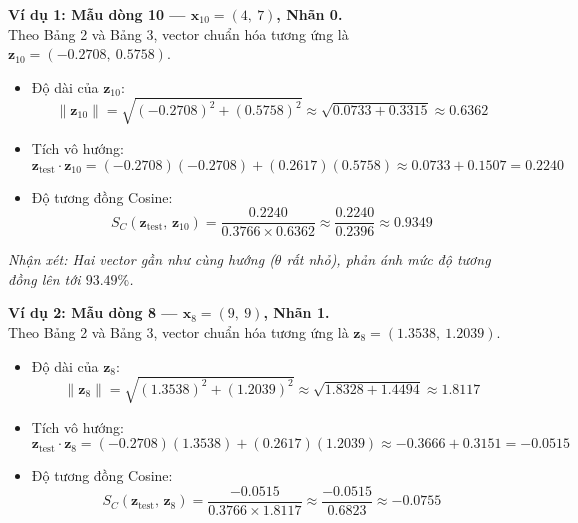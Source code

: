 \documentclass[12pt,a4paper]{article}
\begin{document}
\vspace{0.5cm}
\textbf{Ví dụ 1: Mẫu dòng 10 --- $\mathbf{x}_{10} = (4,\ 7)$, Nhãn 0.}\\
Theo Bảng 2 và Bảng 3, vector chuẩn hóa tương ứng là
$\mathbf{z}_{10} = (-0.2708,\ 0.5758)$.

\begin{itemize}
    \item Độ dài của $\mathbf{z}_{10}$:
    \begin{equation}
        \|\mathbf{z}_{10}\|
        = \sqrt{(-0.2708)^2 + (0.5758)^2}
        \approx \sqrt{0.0733 + 0.3315}
        \approx 0.6362
    \end{equation}

    \item Tích vô hướng:
    \begin{equation}
        \mathbf{z}_{\text{test}} \cdot \mathbf{z}_{10}
        = (-0.2708)(-0.2708) + (0.2617)(0.5758)
        \approx 0.0733 + 0.1507
        = 0.2240
    \end{equation}

    \item Độ tương đồng Cosine:
    \begin{equation}
        S_C(\mathbf{z}_{\text{test}},\, \mathbf{z}_{10})
        = \frac{0.2240}{0.3766 \times 0.6362}
        \approx \frac{0.2240}{0.2396}
        \approx 0.9349
    \end{equation}
\end{itemize}

\textit{Nhận xét: Hai vector gần như cùng hướng ($\theta$ rất nhỏ),
phản ánh mức độ tương đồng lên tới $93.49\%$.}

\vspace{0.5cm}
\textbf{Ví dụ 2: Mẫu dòng 8 --- $\mathbf{x}_8 = (9,\ 9)$, Nhãn 1.}\\
Theo Bảng 2 và Bảng 3, vector chuẩn hóa tương ứng là
$\mathbf{z}_8 = (1.3538,\ 1.2039)$.

\begin{itemize}
    \item Độ dài của $\mathbf{z}_8$:
    \begin{equation}
        \|\mathbf{z}_8\|
        = \sqrt{(1.3538)^2 + (1.2039)^2}
        \approx \sqrt{1.8328 + 1.4494}
        \approx 1.8117
    \end{equation}

    \item Tích vô hướng:
    \begin{equation}
        \mathbf{z}_{\text{test}} \cdot \mathbf{z}_8
        = (-0.2708)(1.3538) + (0.2617)(1.2039)
        \approx -0.3666 + 0.3151
        = -0.0515
    \end{equation}

    \item Độ tương đồng Cosine:
    \begin{equation}
        S_C(\mathbf{z}_{\text{test}},\, \mathbf{z}_8)
        = \frac{-0.0515}{0.3766 \times 1.8117}
        \approx \frac{-0.0515}{0.6823}
        \approx -0.0755
    \end{equation}
\end{itemize}
\end{document}
